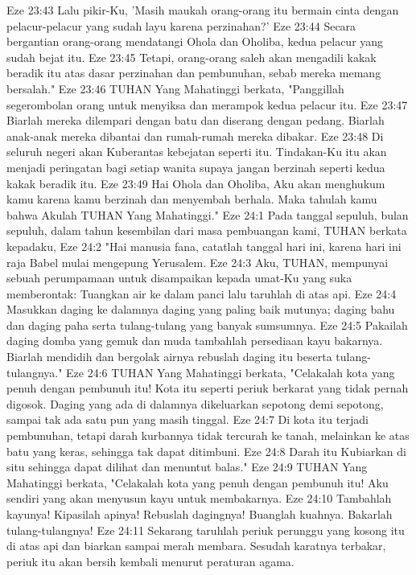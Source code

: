 Eze 23:43  Lalu pikir-Ku, 'Masih maukah orang-orang itu bermain cinta dengan pelacur-pelacur yang sudah layu karena perzinahan?'
Eze 23:44  Secara bergantian orang-orang mendatangi Ohola dan Oholiba, kedua pelacur yang sudah bejat itu.
Eze 23:45  Tetapi, orang-orang saleh akan mengadili kakak beradik itu atas dasar perzinahan dan pembunuhan, sebab mereka memang bersalah."
Eze 23:46  TUHAN Yang Mahatinggi berkata, "Panggillah segerombolan orang untuk menyiksa dan merampok kedua pelacur itu.
Eze 23:47  Biarlah mereka dilempari dengan batu dan diserang dengan pedang. Biarlah anak-anak mereka dibantai dan rumah-rumah mereka dibakar.
Eze 23:48  Di seluruh negeri akan Kuberantas kebejatan seperti itu. Tindakan-Ku itu akan menjadi peringatan bagi setiap wanita supaya jangan berzinah seperti kedua kakak beradik itu.
Eze 23:49  Hai Ohola dan Oholiba, Aku akan menghukum kamu karena kamu berzinah dan menyembah berhala. Maka tahulah kamu bahwa Akulah TUHAN Yang Mahatinggi."
Eze 24:1  Pada tanggal sepuluh, bulan sepuluh, dalam tahun kesembilan dari masa pembuangan kami, TUHAN berkata kepadaku,
Eze 24:2  "Hai manusia fana, catatlah tanggal hari ini, karena hari ini raja Babel mulai mengepung Yerusalem.
Eze 24:3  Aku, TUHAN, mempunyai sebuah perumpamaan untuk disampaikan kepada umat-Ku yang suka memberontak: Tuangkan air ke dalam panci lalu taruhlah di atas api.
Eze 24:4  Masukkan daging ke dalamnya daging yang paling baik mutunya; daging bahu dan daging paha serta tulang-tulang yang banyak sumsumnya.
Eze 24:5  Pakailah daging domba yang gemuk dan muda tambahlah persediaan kayu bakarnya. Biarlah mendidih dan bergolak airnya rebuslah daging itu beserta tulang-tulangnya."
Eze 24:6  TUHAN Yang Mahatinggi berkata, "Celakalah kota yang penuh dengan pembunuh itu! Kota itu seperti periuk berkarat yang tidak pernah digosok. Daging yang ada di dalamnya dikeluarkan sepotong demi sepotong, sampai tak ada satu pun yang masih tinggal.
Eze 24:7  Di kota itu terjadi pembunuhan, tetapi darah kurbannya tidak tercurah ke tanah, melainkan ke atas batu yang keras, sehingga tak dapat ditimbuni.
Eze 24:8  Darah itu Kubiarkan di situ sehingga dapat dilihat dan menuntut balas."
Eze 24:9  TUHAN Yang Mahatinggi berkata, "Celakalah kota yang penuh dengan pembunuh itu! Aku sendiri yang akan menyusun kayu untuk membakarnya.
Eze 24:10  Tambahlah kayunya! Kipasilah apinya! Rebuslah dagingnya! Buanglah kuahnya. Bakarlah tulang-tulangnya!
Eze 24:11  Sekarang taruhlah periuk perunggu yang kosong itu di atas api dan biarkan sampai merah membara. Sesudah karatnya terbakar, periuk itu akan bersih kembali menurut peraturan agama.
